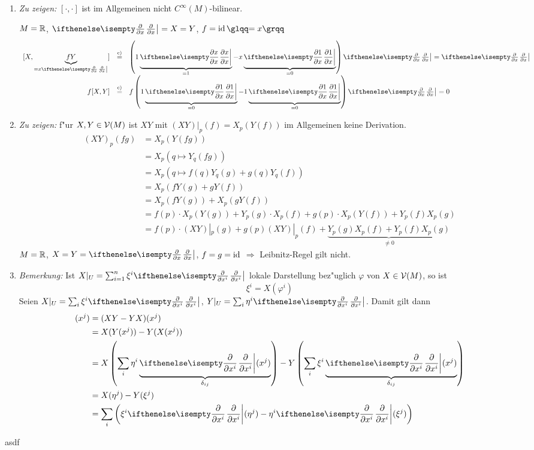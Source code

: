\begin{Loes}\begin{enumerate}[label=\alph*),leftmargin=*,widest=a]
\item
	\emph{Zu zeigen:} $[\cdot,\cdot]$ ist im Allgemeinen nicht $C^{\infty}(M)$-bilinear.
	
	$M = \operatorname{\mathbb{R}}$, $\pdifffrac{}{x} = X = Y$, $f = \Id \quot{= x}$
		\[\begin{array}{rcl} [X,\underbrace{fY}_{=x \pdifffrac{}{x}}] &\overset{\text{c)}}{=}& \left( 1 \underbrace{\pdifffrac{x}{x}}_{=1} - x \underbrace{\pdifffrac{1}{x}}_{=0} \right) \pdifffrac{}{x} = \pdifffrac{}{x} \\
			f[X,Y] &\overset{\text{c)}}{=}& f \left( 1 \underbrace{\pdifffrac{1}{x}}_{=0} - 1 \underbrace{\pdifffrac{1}{x}}_{=0} \right) \pdifffrac{}{x} = 0 \end{array}\]
\item
	\emph{Zu zeigen:} f"ur $X, Y \in \operatorname{\mathcal{V}}(M)$ ist $XY$ mit $(XY)|_p(f) = X_p(Y(f))$ im Allgemeinen keine Derivation.
	\begin{align*}
		(XY)_p(fg) &= X_p(Y(fg))\\
		&= X_p(q \mapsto Y_q(fg))\\
		&= X_p(q \mapsto f(q) Y_q(g) + g(q) Y_q(f))\\
		&= X_p(fY(g) + gY(f))\\
		&= X_p(fY(g)) + X_p(gY(f))\\
		&= f(p) \cdot X_p(Y(g)) + Y_p(g) \cdot X_p(f) + g(p) \cdot X_p(Y(f)) + Y_p(f)X_p(g)\\
		&= f(p) \cdot (XY)|_p(g) + g(p)(XY)|_p(f) + \underbrace{Y_p(g)X_p(f) + Y_p(f)X_p(g)}_{\ne 0}
	\end{align*}
	$M = \operatorname{\mathbb{R}}$, $X = Y = \pdifffrac{}{x}$, $f = g = \operatorname{id}$ $\Rightarrow $ Leibnitz-Regel gilt nicht.
\item
	\emph{Bemerkung:} Ist $X|_U = \sum_{i=1}^{n}\xi^{i}\pdifffrac{}{x^{i}}$ lokale Darstellung bez"uglich $\varphi$ von $X \in \operatorname{\mathcal{V}}(M)$, so ist
		\[ \xi^{i} = X(\varphi^{i}) \]
	Seien $X|_U = \sum_i \xi^i \pdifffrac{}{x^{i}}$, $Y|_U = \sum_i \eta^{i} \pdifffrac{}{x^{i}}$. Damit gilt dann
	\begin{align*}
		[X,Y](x^j) &= (XY - YX)(x^j)\\
		&= X(Y(x^j)) - Y(X(x^j))\\
		&= X\left(\sum_i \eta^{i}\underbrace{\pdifffrac{}{x^{i}}(x^j)}_{\delta_{ij}}\right) - Y\left(\sum_i \xi^{i}\underbrace{\pdifffrac{}{x^{i}}(x^j)}_{\delta_{ij}}\right)\\
		&= X(\eta^j) - Y(\xi^j)\\
		&= \sum_i \left( \xi^{i} \pdifffrac{}{x^{i}}(\eta^j) - \eta^{i} \pdifffrac{}{x^{i}}(\xi^j) \right)
	\end{align*}
\end{enumerate}\end{Loes}

\begin{Loes}
asdf
\end{Loes}